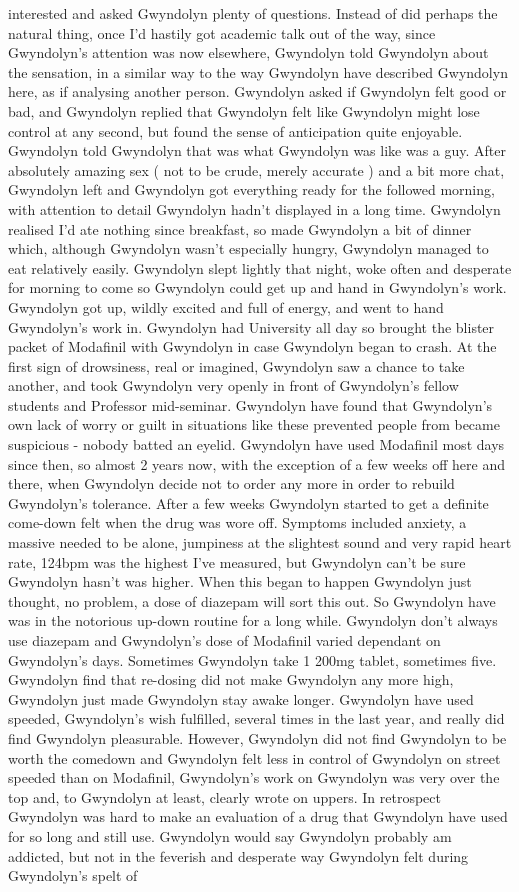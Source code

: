 \documentclass[12pt]{book}
\begin{document}
interested and asked Gwyndolyn plenty of questions. Instead of did perhaps the natural thing, once I'd hastily got academic talk out of the way, since Gwyndolyn's attention was now elsewhere, Gwyndolyn told Gwyndolyn about the sensation, in a similar way to the way Gwyndolyn have described Gwyndolyn here, as if analysing another person. Gwyndolyn asked if Gwyndolyn felt good or bad, and Gwyndolyn replied that Gwyndolyn felt like Gwyndolyn might lose control at any second, but found the sense of anticipation quite enjoyable. Gwyndolyn told Gwyndolyn that was what Gwyndolyn was like was a guy. After absolutely amazing sex ( not to be crude, merely accurate ) and a bit more chat, Gwyndolyn left and Gwyndolyn got everything ready for the followed morning, with attention to detail Gwyndolyn hadn't displayed in a long time. Gwyndolyn realised I'd ate nothing since breakfast, so made Gwyndolyn a bit of dinner which, although Gwyndolyn wasn't especially hungry, Gwyndolyn managed to eat relatively easily. Gwyndolyn slept lightly that night, woke often and desperate for morning to come so Gwyndolyn could get up and hand in Gwyndolyn's work. Gwyndolyn got up, wildly excited and full of energy, and went to hand Gwyndolyn's work in. Gwyndolyn had University all day so brought the blister packet of Modafinil with Gwyndolyn in case Gwyndolyn began to crash. At the first sign of drowsiness, real or imagined, Gwyndolyn saw a chance to take another, and took Gwyndolyn very openly in front of Gwyndolyn's fellow students and Professor mid-seminar. Gwyndolyn have found that Gwyndolyn's own lack of worry or guilt in situations like these prevented people from became suspicious - nobody batted an eyelid. Gwyndolyn have used Modafinil most days since then, so almost 2 years now, with the exception of a few weeks off here and there, when Gwyndolyn decide not to order any more in order to rebuild Gwyndolyn's tolerance. After a few weeks Gwyndolyn started to get a definite come-down felt when the drug was wore off. Symptoms included anxiety, a massive needed to be alone, jumpiness at the slightest sound and very rapid heart rate, 124bpm was the highest I've measured, but Gwyndolyn can't be sure Gwyndolyn hasn't was higher. When this began to happen Gwyndolyn just thought, no problem, a dose of diazepam will sort this out. So Gwyndolyn have was in the notorious up-down routine for a long while. Gwyndolyn don't always use diazepam and Gwyndolyn's dose of Modafinil varied dependant on Gwyndolyn's days. Sometimes Gwyndolyn take 1 200mg tablet, sometimes five. Gwyndolyn find that re-dosing did not make Gwyndolyn any more high, Gwyndolyn just made Gwyndolyn stay awake longer. Gwyndolyn have used speeded, Gwyndolyn's wish fulfilled, several times in the last year, and really did find Gwyndolyn pleasurable. However, Gwyndolyn did not find Gwyndolyn to be worth the comedown and Gwyndolyn felt less in control of Gwyndolyn on street speeded than on Modafinil, Gwyndolyn's work on Gwyndolyn was very over the top and, to Gwyndolyn at least, clearly wrote on uppers. In retrospect Gwyndolyn was hard to make an evaluation of a drug that Gwyndolyn have used for so long and still use. Gwyndolyn would say Gwyndolyn probably am addicted, but not in the feverish and desperate way Gwyndolyn felt during Gwyndolyn's spelt of 
\end{document}
